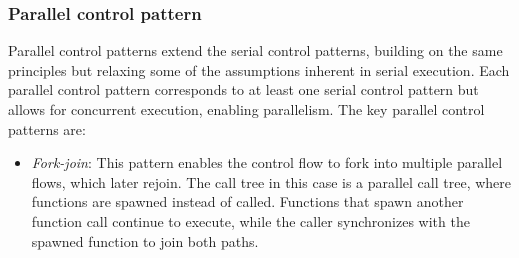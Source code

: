 \subsubsection{Parallel control pattern}
Parallel control patterns extend the serial control patterns, building on the same principles but relaxing some of the assumptions inherent in serial execution. 
Each parallel control pattern corresponds to at least one serial control pattern but allows for concurrent execution, enabling parallelism.
The key parallel control patterns are:
\begin{itemize}
    \item \textit{Fork-join}: This pattern enables the control flow to fork into multiple parallel flows, which later rejoin. 
        The call tree in this case is a parallel call tree, where functions are spawned instead of called. 
        Functions that spawn another function call continue to execute, while the caller synchronizes with the spawned function to join both paths. 


\end{itemize}
